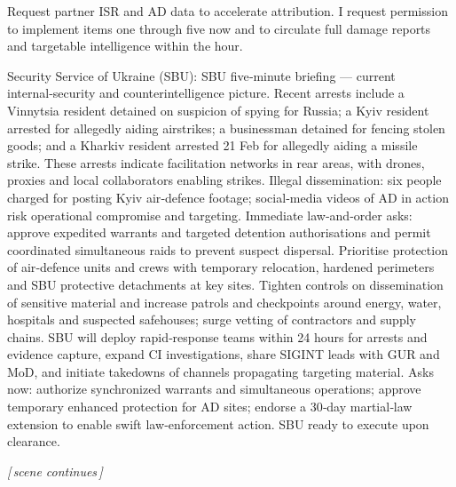 \begin{zhblock}
Request partner ISR and AD data to accelerate attribution. I request permission to implement items one through five now and to circulate full damage reports and targetable intelligence within the hour.
\par Security Service of Ukraine (SBU):
SBU five‑minute briefing — current internal‑security and counterintelligence picture.
Recent arrests include a Vinnytsia resident detained on suspicion of spying for Russia; a Kyiv resident arrested for allegedly aiding airstrikes; a businessman detained for fencing stolen goods; and a Kharkiv resident arrested 21 Feb for allegedly aiding a missile strike.
These arrests indicate facilitation networks in rear areas, with drones, proxies and local collaborators enabling strikes.
Illegal dissemination: six people charged for posting Kyiv air‑defence footage; social‑media videos of AD in action risk operational compromise and targeting.
Immediate law‑and‑order asks: approve expedited warrants and targeted detention authorisations and permit coordinated simultaneous raids to prevent suspect dispersal.
Prioritise protection of air‑defence units and crews with temporary relocation, hardened perimeters and SBU protective detachments at key sites.
Tighten controls on dissemination of sensitive material and increase patrols and checkpoints around energy, water, hospitals and suspected safehouses; surge vetting of contractors and supply chains.
SBU will deploy rapid‑response teams within 24 hours for arrests and evidence capture, expand CI investigations, share SIGINT leads with GUR and MoD, and initiate takedowns of channels propagating targeting material.
Asks now: authorize synchronized warrants and simultaneous operations; approve temporary enhanced protection for AD sites; endorse a 30‑day martial‑law extension to enable swift law‑enforcement action. SBU ready to execute upon clearance.
\par\textit{[\,scene continues\,]}
\end{zhblock}

